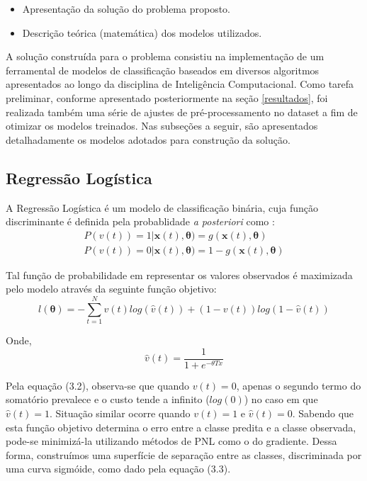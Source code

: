 \documentclass{homework}
\begin{document}
\begin{itemize}
    \color{red}
        \item Apresentação da solução do problema proposto.
        \item Descrição teórica (matemática) dos modelos utilizados.
\end{itemize}

A solução construída para o problema consistiu na implementação de um ferramental de modelos de classificação baseados
em diversos algoritmos apresentados ao longo da disciplina de Inteligência Computacional. Como tarefa preliminar,
conforme apresentado posteriormente na seção \ref{resultados}, foi realizada também uma série de ajustes de
pré-processamento no dataset a fim de otimizar os modelos treinados. Nas subseções a seguir, são apresentados
detalhadamente os modelos adotados para construção da solução.

\subsection{Regressão Logística}

A Regressão Logística é um modelo de classificação binária, cuja função discriminante é definida pela probablidade
\textit{a posteriori} como \cite{evsukoff}:
\begin{equation}
    \begin{split}
        P(v(t)) = 1|\mathbf{x}(t),\mathbf{\theta}) = g(\mathbf{x}(t),\mathbf{\theta}) \\
        P(v(t)) = 0|\mathbf{x}(t),\mathbf{\theta}) = 1 - g(\mathbf{x}(t),\mathbf{\theta})
    \end{split}
\end{equation}

Tal função de probabilidade em representar os valores observados é maximizada pelo modelo através da seguinte função
objetivo:
\begin{equation}
    l(\mathbf{\theta}) = - \sum_{t=1}^{N}v(t)log(\hat{v}(t)) + (1-v(t))log(1-\hat{v}(t))
\end{equation}

Onde,
\begin{equation}
    \hat{v}(t) = \frac{1}{1+e^{-\theta T x}}
\end{equation}

Pela equação (3.2), observa-se que quando $v(t) = 0$, apenas o segundo termo do somatório prevalece e o custo
tende a infinito ($log(0)$) no caso em que $\hat{v}(t) = 1$. Situação similar ocorre quando $v(t) = 1$ e $\hat{v}(t)=0$.
Sabendo que esta função objetivo determina o erro entre a classe predita e a classe observada, pode-se minimizá-la
utilizando métodos de PNL como o do gradiente. Dessa forma, construímos uma superfície de separação entre as classes,
discriminada por uma curva sigmóide, como dado pela equação (3.3).
\end{document}
